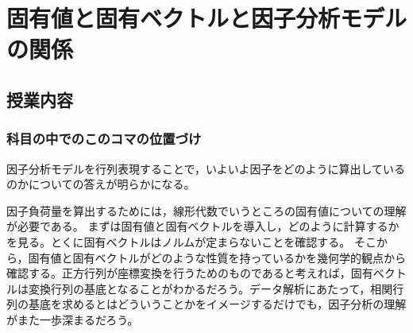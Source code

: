 \section{固有値と固有ベクトルと因子分析モデルの関係}
\subsection{授業内容}
\subsubsection{科目の中でのこのコマの位置づけ}
因子分析モデルを行列表現することで，いよいよ因子をどのように算出しているのかについての答えが明らかになる。

因子負荷量を算出するためには，線形代数でいうところの固有値についての理解が必要である。
まずは固有値と固有ベクトルを導入し，どのように計算するかを見る。とくに固有ベクトルはノルムが定まらないことを確認する。
そこから，固有値と固有ベクトルがどのような性質を持っているかを幾何学的観点から確認する。正方行列が座標変換を行うためのものであると考えれば，固有ベクトルは変換行列の基底となることがわかるだろう。データ解析にあたって，相関行列の基底を求めるとはどういうことかをイメージするだけでも，因子分析の理解がまた一歩深まるだろう。
